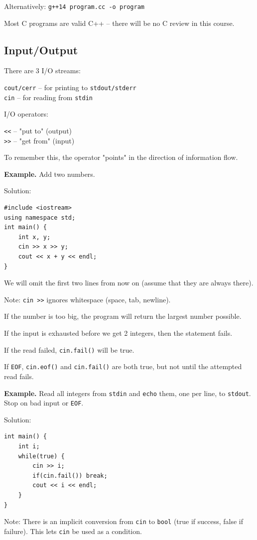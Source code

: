 \documentclass[11pt]{article}
\theoremstyle{definition}
\begin{document}
Alternatively: {\tt g++14 program.cc -o program}

Most C programs are valid C++ -- there will be no C review in this course. 

\subsection{Input/Output}
There are 3 I/O streams: 

{\tt cout/cerr} -- for printing to {\tt stdout/stderr} \\
{\tt cin} -- for reading from {\tt stdin} 

I/O operators: 

{\tt <\null<} -- "put to" (output) \\
{\tt >\null>} -- "get from" (input)

To remember this, the operator "points" in the direction of information flow.

{\bf Example.} Add two numbers.

Solution:
\begin{lstlisting}
#include <iostream>
using namespace std;
int main() {
    int x, y;
    cin >> x >> y;
    cout << x + y << endl;
}
\end{lstlisting}
We will omit the first two lines from now on (assume that they are always there). 

Note: {\tt cin >\null>} ignores whitespace (space, tab, newline). 

If the number is too big, the program will return the largest number possible.

If the input is exhausted before we get 2 integers, then the statement fails. 

If the read failed, {\tt cin.fail()} will be true.

If {\tt EOF}, {\tt cin.eof()} and {\tt cin.fail()} are both true, but not until the attempted read fails.

{\bf Example.} Read all integers from {\tt stdin} and {\tt echo} them, one per line, to {\tt stdout}. Stop on bad input or {\tt EOF}. 

Solution:
\begin{lstlisting}
int main() {
    int i;
    while(true) {
        cin >> i;
        if(cin.fail()) break;
        cout << i << endl;
    }
}
\end{lstlisting}
Note: There is an implicit conversion from {\tt cin} to {\tt bool} (true if success, false if failure). This lets {\tt cin} be used as a condition.
\end{document}
